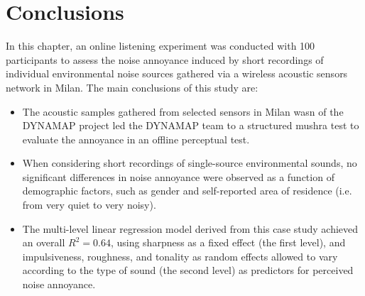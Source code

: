 


\section{Conclusions}

In this chapter, an online listening experiment was conducted with 100 participants to assess the noise annoyance induced by short recordings of individual environmental noise sources gathered via a wireless acoustic sensors network in Milan. The main conclusions of this study are:

\begin{itemize}
  \item The acoustic samples gathered from selected sensors in Milan \gls{wasn} of the DYNAMAP project led the DYNAMAP team to a structured \gls{mushra} test to evaluate the annoyance in an offline perceptual test.
  \item When considering short recordings of single-source environmental sounds, no significant differences in noise annoyance were observed as a function of demographic factors, such as gender and self-reported area of residence (i.e. from very quiet to very noisy).
  \item The multi-level linear regression model derived from this case study achieved an overall $R^2=0.64$, using sharpness as a fixed effect (the first level), and impulsiveness, roughness, and tonality as random effects allowed to vary according to the type of sound (the second level) as predictors for perceived noise annoyance.
\end{itemize}


